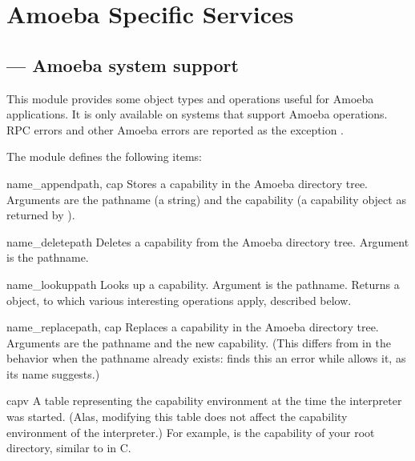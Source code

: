 \chapter{Amoeba Specific Services}

\section{ ---
         Amoeba system support}



This module provides some object types and operations useful for
Amoeba applications.  It is only available on systems that support
Amoeba operations.  RPC errors and other Amoeba errors are reported as
the exception .

The module  defines the following items:

\begin{funcdesc}{name_append}{path, cap}
Stores a capability in the Amoeba directory tree.
Arguments are the pathname (a string) and the capability (a capability
object as returned by
).
\end{funcdesc}

\begin{funcdesc}{name_delete}{path}
Deletes a capability from the Amoeba directory tree.
Argument is the pathname.
\end{funcdesc}

\begin{funcdesc}{name_lookup}{path}
Looks up a capability.
Argument is the pathname.
Returns a
object, to which various interesting operations apply, described below.
\end{funcdesc}

\begin{funcdesc}{name_replace}{path, cap}
Replaces a capability in the Amoeba directory tree.
Arguments are the pathname and the new capability.
(This differs from
in the behavior when the pathname already exists:
finds this an error while
allows it, as its name suggests.)
\end{funcdesc}

\begin{datadesc}{capv}
A table representing the capability environment at the time the
interpreter was started.
(Alas, modifying this table does not affect the capability environment
of the interpreter.)
For example,
is the capability of your root directory, similar to
in C.
\end{datadesc}

